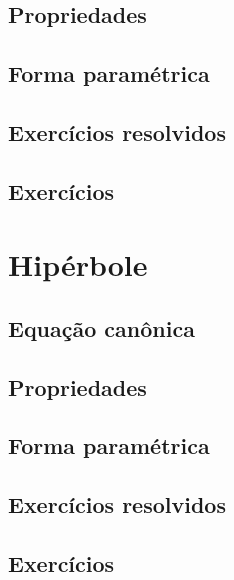 \subsection{Propriedades}
\construirSec

\subsection{Forma paramétrica}
\construirSec

\subsection*{Exercícios resolvidos}
\construirExeresol

\subsection*{Exercícios}
\construirExer



\section{Hipérbole}
\construirSec

\subsection{Equação canônica}
\construirSec

\subsection{Propriedades}
\construirSec

\subsection{Forma paramétrica}
\construirSec

\subsection*{Exercícios resolvidos}

\construirExeresol


\subsection*{Exercícios}

